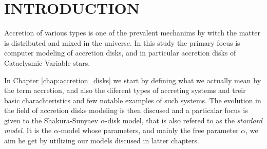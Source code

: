 \chapter{INTRODUCTION}
\thispagestyle{empty}


Accretion of various types is one of the prevalent mechanims by witch the matter is distributed and mixed in the universe. In this study the primary focus is computer modeling of accretion disks, and in particular accretion disks of Cataclysmic Variable stars.

In Chapter \ref{chap:accretion_disks} we start by defining what we actually mean by the term accretion, and also the diferent types of accreting systems and treir basic charachteristics and few notable examples of such systems. The evolution in the field of accretion disks modeling is then discused and a particalar focus is given to the Shakura-Sunyaev $\alpha$-disk model, that is also refered to as the \emph{stardard model}. It is the $\alpha$-model whose parameters, and mainly the free parameter $\alpha$, we aim he get by utilizing our models discused in latter chapters.
